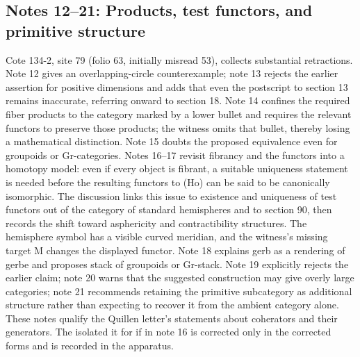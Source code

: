 \documentclass[10pt,oneside]{book}
\begin{document}
\subsection*{Notes 12--21: Products, test functors, and primitive structure}
Cote 134-2, site 79 (folio 63, initially misread 53), collects substantial retractions. Note 12 gives an overlapping-circle counterexample; note 13 rejects the earlier assertion for positive dimensions and adds that even the postscript to section 13 remains inaccurate, referring onward to section 18. Note 14 confines the required fiber products to the category marked by a lower bullet and requires the relevant functors to preserve those products; the witness omits that bullet, thereby losing a mathematical distinction. Note 15 doubts the proposed equivalence even for groupoids or Gr-categories. Notes 16--17 revisit fibrancy and the functors into a homotopy model: even if every object is fibrant, a suitable uniqueness statement is needed before the resulting functors to (Ho) can be said to be canonically isomorphic. The discussion links this issue to existence and uniqueness of test functors out of the category of standard hemispheres and to section 90, then records the shift toward asphericity and contractibility structures. The hemisphere symbol has a visible curved meridian, and the witness's missing target M changes the displayed functor. Note 18 explains gerb as a rendering of gerbe and proposes stack of groupoids or Gr-stack. Note 19 explicitly rejects the earlier claim; note 20 warns that the suggested construction may give overly large categories; note 21 recommends retaining the primitive subcategory as additional structure rather than expecting to recover it from the ambient category alone. These notes qualify the Quillen letter's statements about coherators and their generators. The isolated it for if in note 16 is corrected only in the corrected forms and is recorded in the apparatus.
\end{document}
